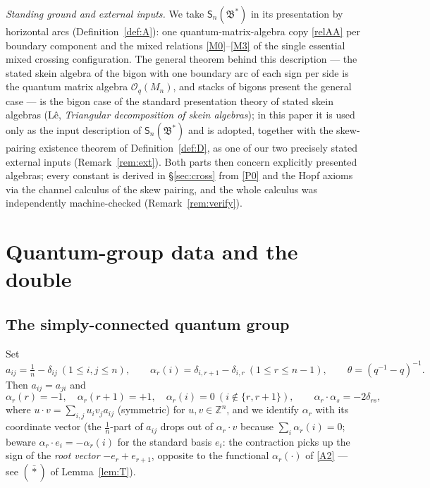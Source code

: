 \documentclass[11pt]{article}
\theoremstyle{definition}
\theoremstyle{remark}
\newcommand{\Z}{\mathbb{Z}}
\newcommand{\B}{\mathfrak{B}}
\newcommand{\Sn}{\mathsf{S}_n}
\newcommand{\del}{\delta}
\newcommand{\tht}{\theta}
\begin{document}
\noindent\emph{Standing ground and external inputs.}  We take
$\Sn(\B^*)$ in its presentation by horizontal arcs
(Definition~\ref{def:A}): one quantum-matrix-algebra copy
\eqref{relAA} per boundary component and the mixed relations
\eqref{M0}--\eqref{M3} of the single essential mixed crossing
configuration.  The general theorem behind this description — the
stated skein algebra of the bigon with one boundary arc of each sign
per side is the quantum matrix algebra $\mathcal O_q(M_n)$, and
stacks of bigons present the general case — is the bigon case of the
standard presentation theory of stated skein algebras (L\^e,
\emph{Triangular decomposition of skein algebras}); in this paper it
is used only as the input description of $\Sn(\B^*)$ and is adopted,
together with the skew-pairing existence theorem of
Definition~\ref{def:D}, as one of our two precisely stated external
inputs (Remark~\ref{rem:ext}).  Both parts then concern explicitly
presented algebras; every constant is derived in \S\ref{sec:cross}
from \eqref{P0} and the Hopf axioms via the channel calculus of the
skew pairing, and the whole calculus was independently
machine-checked (Remark~\ref{rem:verify}).

\section{Quantum-group data and the double}\label{sec:qg}

\subsection{The simply-connected quantum group}

Set
\[
a_{ij}=\tfrac1n-\del_{ij}\ (1\le i,j\le n),\qquad
\alpha_r(i)=\del_{i,r+1}-\del_{i,r}\ (1\le r\le n-1),\qquad
\tht=(q^{-1}-q)^{-1}.
\]
Then $a_{ij}=a_{ji}$ and
\begin{equation}
\alpha_r(r)=-1,\quad \alpha_r(r+1)=+1,\quad \alpha_r(i)=0\
(i\notin\{r,r+1\}),\qquad \alpha_r\cdot\alpha_s=-2\del_{rs},
\label{A2}\tag{A2}
\end{equation}
where $u\cdot v=\sum_{i,j}u_iv_ja_{ij}$ (symmetric) for
$u,v\in\Z^n$, and we identify $\alpha_r$ with its coordinate vector
(the $\tfrac1n$-part of $a_{ij}$ drops out of $\alpha_r\cdot v$
because $\sum_i\alpha_r(i)=0$; beware
$\alpha_r\cdot e_i=-\alpha_r(i)$ for the standard basis $e_i$:
the contraction picks up the sign of the \emph{root vector}
$-e_r+e_{r+1}$, opposite to the functional $\alpha_r(\cdot)$
of \eqref{A2} — see $(\bar\ast)$ of Lemma~\ref{lem:T}).
\end{document}
